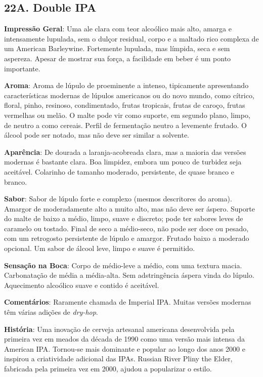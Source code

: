 \subsection*{22A. Double IPA}
\textbf{Impressão Geral}: Uma ale clara com teor alcoólico mais alto, amarga e intensamente lupulada, sem o dulçor residual, corpo e a maltado rico complexa de um American Barleywine. Fortemente lupulada, mas límpida, seca e sem aspereza. Apesar de mostrar sua força, a facilidade em beber é um ponto importante.

\textbf{Aroma}: Aroma de lúpulo de proeminente a intenso, tipicamente apresentando características modernas de lúpulos americanos ou do novo mundo, como cítrico, floral, pinho, resinoso, condimentado, frutas tropicais, frutas de caroço, frutas vermelhas ou melão. O malte pode vir como suporte, em segundo plano, limpo, de neutro a como cereais. Perfil de fermentação neutro a levemente frutado. O álcool pode ser notado, mas não deve ser similar a solvente.

\textbf{Aparência}: De dourada a laranja-acobreada clara, mas a maioria das versões modernas é bastante clara. Boa limpidez, embora um pouco de turbidez seja aceitável. Colarinho de tamanho moderado, persistente, de quase branco e branco.

\textbf{Sabor}: Sabor de lúpulo forte e complexo (mesmos descritores do aroma). Amargor de moderadamente alto a muito alto, mas não deve ser áspero. Suporte do malte de baixo a médio, limpo, suave e discreto; pode ter sabores leves de caramelo ou tostado. Final de seco a médio-seco, não pode ser doce ou pesado, com um retrogosto persistente de lúpulo e amargor. Frutado baixo a moderado opcional. Um sabor de álcool leve, limpo e suave é permitido.

\textbf{Sensação na Boca}: Corpo de médio-leve a médio, com uma textura macia. Carbonatação de média a média-alta. Sem adstringência áspera vinda do lúpulo. Aquecimento alcoólico suave e contido é aceitável.

\textbf{Comentários}: Raramente chamada de Imperial IPA. Muitas versões modernas têm várias adições de \textit{dry-hop}.

\textbf{História}: Uma inovação de cerveja artesanal americana desenvolvida pela primeira vez em meados da década de 1990 como uma versão mais intensa da American IPA. Tornou-se mais dominante e popular ao longo dos anos 2000 e inspirou a criatividade adicional das IPAs. Russian River Pliny the Elder, fabricada pela primeira vez em 2000, ajudou a popularizar o estilo.

